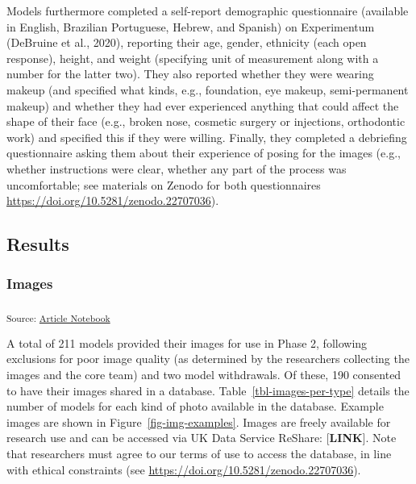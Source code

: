 \documentclass[
  letterpaper,
  DIV=11,
  numbers=noendperiod]{scrartcl}
\begin{document}
Models furthermore completed a self-report demographic questionnaire
(available in English, Brazilian Portuguese, Hebrew, and Spanish) on
Experimentum (DeBruine et al., 2020), reporting their age, gender,
ethnicity (each open response), height, and weight (specifying unit of
measurement along with a number for the latter two). They also reported
whether they were wearing makeup (and specified what kinds, e.g.,
foundation, eye makeup, semi-permanent makeup) and whether they had ever
experienced anything that could affect the shape of their face (e.g.,
broken nose, cosmetic surgery or injections, orthodontic work) and
specified this if they were willing. Finally, they completed a
debriefing questionnaire asking them about their experience of posing
for the images (e.g., whether instructions were clear, whether any part
of the process was uncomfortable; see materials on Zenodo for both
questionnaires \url{https://doi.org/10.5281/zenodo.22707036}).

\subsection{Results}\label{results}

\subsubsection{Images}\label{images}

\textsubscript{Source:
\href{https://ManyFacesTeam.github.io/paper/index.qmd.html}{Article
Notebook}}

A total of 211 models provided their images for use in Phase 2,
following exclusions for poor image quality (as determined by the
researchers collecting the images and the core team) and two model
withdrawals. Of these, 190 consented to have their images shared in a
database. Table~\ref{tbl-images-per-type} details the number of models
for each kind of photo available in the database. Example images are
shown in Figure~\ref{fig-img-examples}. Images are freely available for
research use and can be accessed via UK Data Service ReShare:
{[}\textbf{LINK}{]}. Note that researchers must agree to our terms of
use to access the database, in line with ethical constraints (see
\url{https://doi.org/10.5281/zenodo.22707036}).
\end{document}
